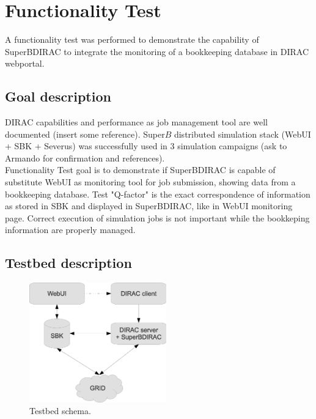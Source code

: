 \documentclass[a4paper]{jpconf}
\begin{document}
\section{Functionality Test}
A functionality test was performed to demonstrate the capability of SuperBDIRAC to integrate the monitoring of a bookkeeping database in DIRAC webportal.
\subsection{Goal description}
DIRAC capabilities and performance as job management tool are well documented (insert some reference). Super$B$ distributed simulation stack (WebUI + SBK + Severus) was successfully used in 3 simulation campaigns (ask to Armando for confirmation and references).\\
Functionality Test goal is to demonstrate if SuperBDIRAC is capable of substitute WebUI as monitoring tool for job submission, showing data from a bookkeeping database. Test "Q-factor" is the exact correspondence of information as stored in SBK and displayed in SuperBDIRAC, like in WebUI monitoring page. Correct execution of simulation jobs is not important while the bookkeping information are properly managed.

\subsection{Testbed description}

\begin{figure}[h]
\includegraphics[width=14pc]{img/testbed.eps}\hspace{2pc}%
\begin{minipage}[b]{14pc}\caption{\label{label}Testbed schema.}
\end{minipage}
\end{figure}
\end{document}
